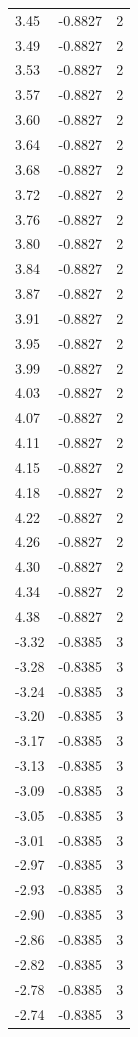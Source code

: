 \begin{longtable}{lrr}
  3.45 & -0.8827 & 2 \\
  3.49 & -0.8827 & 2 \\
  3.53 & -0.8827 & 2 \\
  3.57 & -0.8827 & 2 \\
  3.60 & -0.8827 & 2 \\
  3.64 & -0.8827 & 2 \\
  3.68 & -0.8827 & 2 \\
  3.72 & -0.8827 & 2 \\
  3.76 & -0.8827 & 2 \\
  3.80 & -0.8827 & 2 \\
  3.84 & -0.8827 & 2 \\
  3.87 & -0.8827 & 2 \\
  3.91 & -0.8827 & 2 \\
  3.95 & -0.8827 & 2 \\
  3.99 & -0.8827 & 2 \\
  4.03 & -0.8827 & 2 \\
  4.07 & -0.8827 & 2 \\
  4.11 & -0.8827 & 2 \\
  4.15 & -0.8827 & 2 \\
  4.18 & -0.8827 & 2 \\
  4.22 & -0.8827 & 2 \\
  4.26 & -0.8827 & 2 \\
  4.30 & -0.8827 & 2 \\
  4.34 & -0.8827 & 2 \\
  4.38 & -0.8827 & 2 \\
  -3.32 & -0.8385 & 3 \\
  -3.28 & -0.8385 & 3 \\
  -3.24 & -0.8385 & 3 \\
  -3.20 & -0.8385 & 3 \\
  -3.17 & -0.8385 & 3 \\
  -3.13 & -0.8385 & 3 \\
  -3.09 & -0.8385 & 3 \\
  -3.05 & -0.8385 & 3 \\
  -3.01 & -0.8385 & 3 \\
  -2.97 & -0.8385 & 3 \\
  -2.93 & -0.8385 & 3 \\
  -2.90 & -0.8385 & 3 \\
  -2.86 & -0.8385 & 3 \\
  -2.82 & -0.8385 & 3 \\
  -2.78 & -0.8385 & 3 \\
  -2.74 & -0.8385 & 3 \\

\end{longtable}
